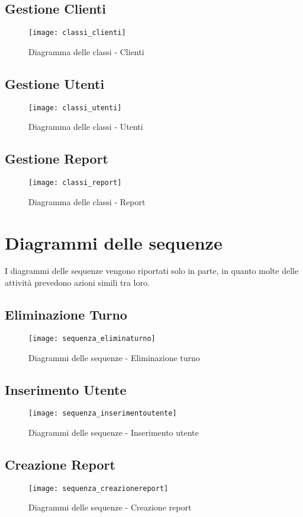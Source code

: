 \documentclass[green, fancy, 11pt]{elegantbook}
\begin{document}
\subsection{Gestione Clienti}
\begin{figure}[H]
	\centering
	\texttt{[image: classi\_clienti]}
	\caption{Diagramma delle classi - Clienti}
\end{figure}
\subsection{Gestione Utenti}
\begin{figure}[H]
	\centering
	\texttt{[image: classi\_utenti]}
	\caption{Diagramma delle classi - Utenti}
\end{figure}
\newpage

\subsection{Gestione Report}
\begin{figure}[H]
	\centering
	\texttt{[image: classi\_report]}
	\caption{Diagramma delle classi - Report}
\end{figure}
\newpage

\section{Diagrammi delle sequenze}
I diagrammi delle sequenze vengono riportati solo in parte, in quanto molte delle attività prevedono azioni simili tra loro.
\subsection{Eliminazione Turno}
\begin{figure}[H]
	\centering
	\texttt{[image: sequenza\_eliminaturno]}
	\caption{Diagrammi delle sequenze - Eliminazione turno}
\end{figure}
\newpage
\subsection{Inserimento Utente}
\begin{figure}[H]
	\centering
	\texttt{[image: sequenza\_inserimentoutente]}
	\caption{Diagrammi delle sequenze - Inserimento utente}
\end{figure}
\subsection{Creazione Report}
\begin{figure}[H]
	\centering
	\texttt{[image: sequenza\_creazionereport]}
	\caption{Diagrammi delle sequenze - Creazione report}
\end{figure}
\newpage
\end{document}
